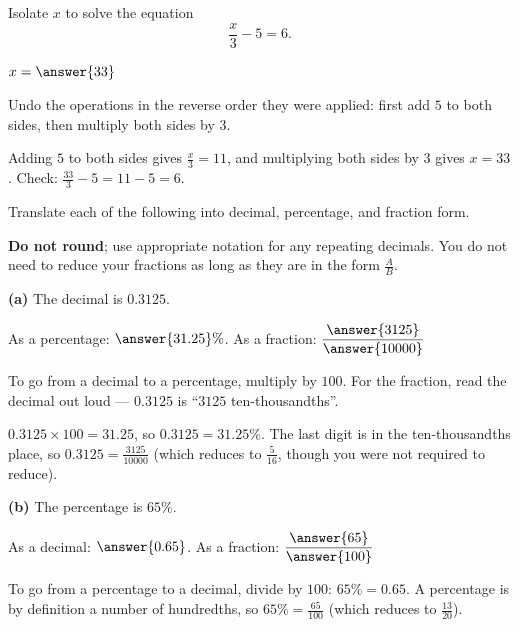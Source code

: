 \documentclass[12pt]{ximera}
\begin{document}
\begin{problem}
Isolate $x$ to solve the equation
\[ \frac{x}{3} - 5 = 6. \]

$x = \answer{33}$

\begin{hint}
Undo the operations in the reverse order they were applied: first add $5$ to both
sides, then multiply both sides by $3$.
\end{hint}

\begin{feedback}
Adding $5$ to both sides gives $\frac{x}{3}=11$, and multiplying both sides by $3$
gives $x=33$. Check: $\frac{33}{3}-5=11-5=6$. \checkmark
\end{feedback}
\end{problem}

\begin{problem}
Translate each of the following into decimal, percentage, and fraction form.

\textbf{Do not round}; use appropriate notation for any repeating decimals. You do
not need to reduce your fractions as long as they are in the form
$\frac{A}{B}$.

\begin{prompt}
\textbf{(a)} The decimal is $0.3125$.

As a percentage: $\answer{31.25}\%$. \qquad
As a fraction: $\dfrac{\answer{3125}}{\answer{10000}}$

\begin{hint}
To go from a decimal to a percentage, multiply by $100$. For the fraction, read the
decimal out loud --- $0.3125$ is ``$3125$ ten-thousandths''.
\end{hint}

\begin{feedback}
$0.3125 \times 100 = 31.25$, so $0.3125 = 31.25\%$. The last digit is in the
ten-thousandths place, so $0.3125 = \frac{3125}{10000}$ (which reduces to
$\frac{5}{16}$, though you were not required to reduce).
\end{feedback}
\end{prompt}

\begin{prompt}
\textbf{(b)} The percentage is $65\%$.

As a decimal: $\answer{0.65}$. \qquad
As a fraction: $\dfrac{\answer{65}}{\answer{100}}$

\begin{feedback}
To go from a percentage to a decimal, divide by $100$: $65\% = 0.65$. A percentage
is by definition a number of hundredths, so $65\% = \frac{65}{100}$ (which reduces
to $\frac{13}{20}$).
\end{feedback}
\end{prompt}


\end{problem}
\end{document}
